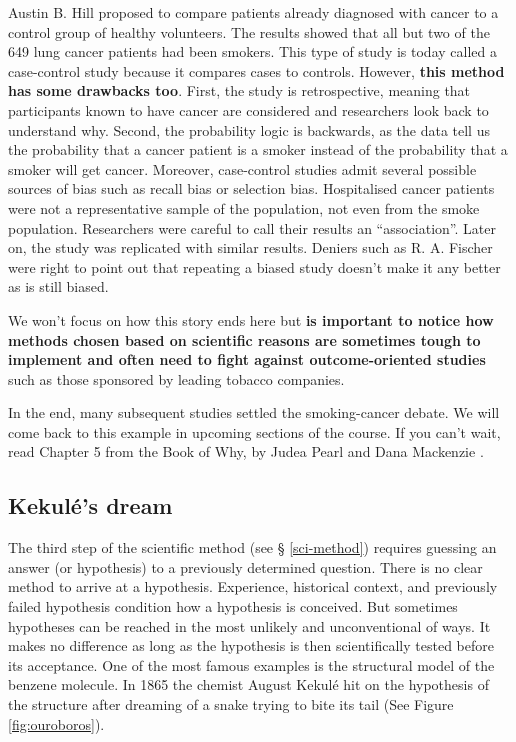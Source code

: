 \documentclass[
]{book}
\begin{document}
Austin B. Hill proposed to compare patients already diagnosed with cancer to a control group of healthy volunteers. The results showed that all but two of the 649 lung cancer patients had been smokers. This type of study is today called a case-control study because it compares cases to controls. However, \textbf{this method has some drawbacks too}. First, the study is retrospective, meaning that participants known to have cancer are considered and researchers look back to understand why. Second, the probability logic is backwards, as the data tell us the probability that a cancer patient is a smoker instead of the probability that a smoker will get cancer. Moreover, case-control studies admit several possible sources of bias such as recall bias or selection bias. Hospitalised cancer patients were not a representative sample of the population, not even from the smoke population. Researchers were careful to call their results an ``association''. Later on, the study was replicated with similar results. Deniers such as R. A. Fischer were right to point out that repeating a biased study doesn't make it any better as is still biased.

We won't focus on how this story ends here but \textbf{is important to notice how methods chosen based on scientific reasons are sometimes tough to implement and often need to fight against outcome-oriented studies} such as those sponsored by leading tobacco companies.

In the end, many subsequent studies settled the smoking-cancer debate. We will come back to this example in upcoming sections of the course. If you can't wait, read Chapter 5 from the Book of Why, by Judea Pearl and Dana Mackenzie \citep{book-of-why}.

\hypertarget{kekuluxe9s-dream}{%
\subsection{Kekulé's dream}\label{kekuluxe9s-dream}}

The third step of the scientific method (see § \ref{sci-method}) requires guessing an answer (or hypothesis) to a previously determined question. There is no clear method to arrive at a hypothesis. Experience, historical context, and previously failed hypothesis condition how a hypothesis is conceived. But sometimes hypotheses can be reached in the most unlikely and unconventional of ways. It makes no difference as long as the hypothesis is then scientifically tested before its acceptance. One of the most famous examples is the structural model of the benzene molecule. In 1865 the chemist August Kekulé hit on the hypothesis of the structure after dreaming of a snake trying to bite its tail (See Figure \ref{fig:ouroboros}).
\end{document}
